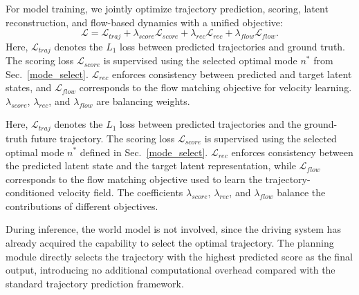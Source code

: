 For model training, we jointly optimize trajectory prediction, scoring, latent reconstruction, and flow-based dynamics with a unified objective:
\begin{equation}
\mathcal{L} = 
\mathcal{L}_{traj} 
+ \lambda_{score}\mathcal{L}_{score} 
+ \lambda_{rec}\mathcal{L}_{rec} 
+ \lambda_{flow}\mathcal{L}_{flow}.
\end{equation}
Here, $\mathcal{L}_{traj}$ denotes the $L_1$ loss between predicted trajectories and ground truth. 
The scoring loss $\mathcal{L}_{score}$ is supervised using the selected optimal mode $n^*$ from Sec.~\ref{mode_select}. 
$\mathcal{L}_{rec}$ enforces consistency between predicted and target latent states, and $\mathcal{L}_{flow}$ corresponds to the flow matching objective for velocity learning. 
$\lambda_{score}$, $\lambda_{rec}$, and $\lambda_{flow}$ are balancing weights.

Here, $\mathcal{L}_{traj}$ denotes the $L_1$ loss between predicted trajectories and the ground-truth future trajectory. 
The scoring loss $\mathcal{L}_{score}$ is supervised using the selected optimal mode $n^*$ defined in Sec.~\ref{mode_select}. 
$\mathcal{L}_{rec}$ enforces consistency between the predicted latent state and the target latent representation, while $\mathcal{L}_{flow}$ corresponds to the flow matching objective used to learn the trajectory-conditioned velocity field. 
The coefficients $\lambda_{score}$, $\lambda_{rec}$, and $\lambda_{flow}$ balance the contributions of different objectives.

During inference, the world model is not involved, since the driving system has already acquired the capability to select the optimal trajectory. 
The planning module directly selects the trajectory with the highest predicted score as the final output, introducing no additional computational overhead compared with the standard trajectory prediction framework.

